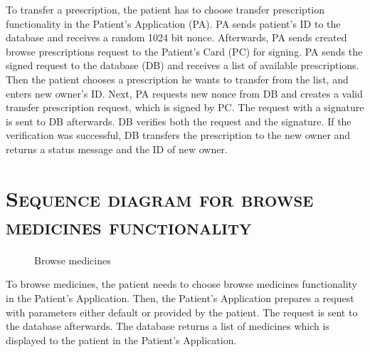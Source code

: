 To transfer a prescription, the patient has to choose transfer prescription functionality in the Patient’s Application (PA). 
PA sends patient’s ID to the database and receives a random 1024 bit nonce. 
Afterwards, PA sends created browse prescriptions request to the Patient’s Card (PC) for signing. 
PA sends the signed request to the database (DB) and receives a list of available prescriptions. 
Then the patient chooses a prescription he wants to transfer from the list, and enters new owner’s ID.
Next, PA requests new nonce from DB and creates a valid transfer prescription request, which is signed by PC. 
The request with a signature is sent to DB afterwards. 
DB verifies both the request and the signature. If the verification was successful, DB transfers the prescription to the new owner and returns a status message and the ID of new owner.
\FloatBarrier

\section{\textsc{Sequence diagram for browse medicines functionality}}
\begin{figure}[!h]
\caption{Browse medicines}
\end{figure}
To browse medicines, the patient needs to choose browse medicines functionality in the Patient’s Application. 
Then, the Patient’s Application prepares a request with parameters either default or provided by the patient. 
The request is sent to the database afterwards. 
The database returns a list of medicines which is displayed to the patient in the Patient’s Application.
\newpage



